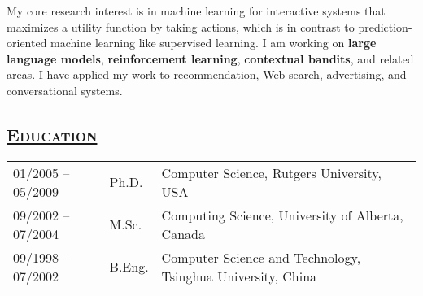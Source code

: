 \documentclass[10pt,twoside,letterpaper]{article}
\newcommand{\tabrowsep}{\vspace{1mm}}
\begin{document}
My core research interest is in machine learning for interactive systems that maximizes a utility function by taking
actions, which is in contrast to prediction-oriented machine learning like supervised learning. I am working on \textbf{large language models}, \textbf{reinforcement learning}, \textbf{contextual bandits}, and related areas. I have applied my work to recommendation,
Web search, advertising, and conversational systems.

\subsection*{\textsc{\underline{Education}}}

\begin{center}
\begin{tabular}{p{30mm} p{15mm} p{115mm}}
01/2005 -- 05/2009 & Ph.D. & Computer Science, Rutgers University, USA \\
09/2002 -- 07/2004 & M.Sc. & Computing Science, University of Alberta, Canada \\
09/1998 -- 07/2002 & B.Eng. & Computer Science and Technology, Tsinghua University, China %
\end{tabular}
\end{center}
\end{document}
